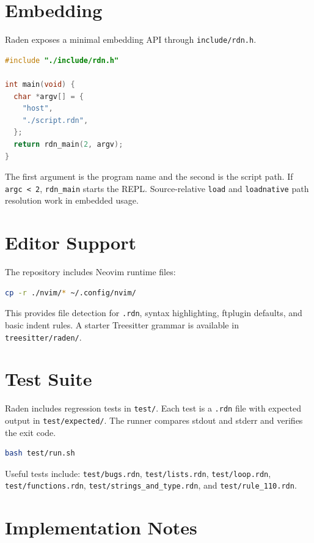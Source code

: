 \documentclass[11pt,a4paper]{article}
\newcommand{\code}[1]{\texttt{#1}}
\begin{document}
\section{Embedding}

Raden exposes a minimal embedding API through \code{include/rdn.h}.

\begin{lstlisting}[language=C]
#include "./include/rdn.h"

int main(void) {
  char *argv[] = {
    "host",
    "./script.rdn",
  };
  return rdn_main(2, argv);
}
\end{lstlisting}

The first argument is the program name and the second is the script path.
If \code{argc < 2}, \code{rdn\_main} starts the REPL. Source-relative
\code{load} and \code{loadnative} path resolution work in embedded usage.

\section{Editor Support}

The repository includes Neovim runtime files:

\begin{lstlisting}[language=bash]
cp -r ./nvim/* ~/.config/nvim/
\end{lstlisting}

This provides file detection for \code{.rdn}, syntax highlighting,
ftplugin defaults, and basic indent rules. A starter Treesitter grammar
is available in \code{treesitter/raden/}.

\section{Test Suite}

Raden includes regression tests in \code{test/}. Each test is a \code{.rdn}
file with expected output in \code{test/expected/}. The runner compares
stdout and stderr and verifies the exit code.

\begin{lstlisting}[language=bash]
bash test/run.sh
\end{lstlisting}

Useful tests include:
\code{test/bugs.rdn}, \code{test/lists.rdn}, \code{test/loop.rdn},
\code{test/functions.rdn}, \code{test/strings\_and\_type.rdn}, and
\code{test/rule\_110.rdn}.

\section{Implementation Notes}
\end{document}
